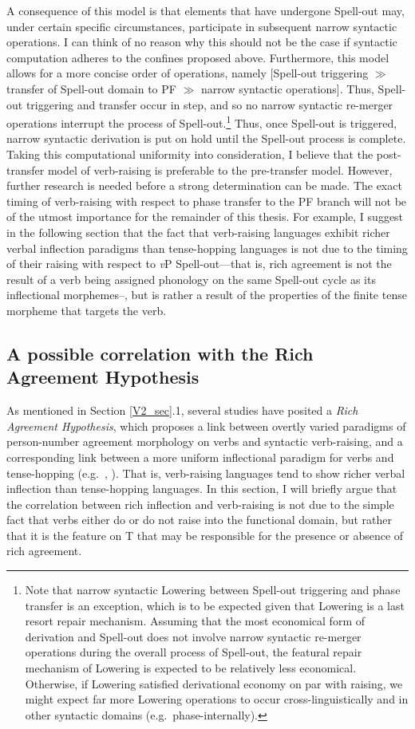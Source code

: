 A consequence of this model is that elements that have undergone Spell-out may, under certain specific circumstances, participate in subsequent narrow syntactic operations. I can think of no reason why this should not be the case if syntactic computation adheres to the confines proposed above. Furthermore, this model allows for a more concise order of operations, namely [Spell-out triggering $\gg$ transfer of Spell-out domain to PF $\gg$ narrow syntactic operations]. Thus, Spell-out triggering and transfer occur in step, and so no narrow syntactic re-merger operations interrupt the process of Spell-out.\footnote{\label{Low_order_fn}Note that narrow syntactic Lowering between Spell-out triggering and phase transfer is an exception, which is to be expected given that Lowering is a last resort repair mechanism. Assuming that the most economical form of derivation and Spell-out does not involve narrow syntactic re-merger operations during the overall process of Spell-out, the featural repair mechanism of Lowering is expected to be relatively less economical. Otherwise, if Lowering satisfied derivational economy on par with raising, we might expect far more Lowering operations to occur cross-linguistically and in other syntactic domains (e.g.\ phase-internally).} Thus, once Spell-out is triggered, narrow syntactic derivation is put on hold until the Spell-out process is complete. Taking this computational uniformity into consideration, I believe that the post-transfer model of verb-raising is preferable to the pre-transfer model. However, further research is needed before a strong determination can be made. The exact timing of verb-raising with respect to phase transfer to the PF branch will not be of the utmost importance for the remainder of this thesis. For example, I suggest in the following section that the fact that verb-raising languages exhibit richer verbal inflection paradigms than tense-hopping languages is not due to the timing of their raising with respect to {\it v}P Spell-out---that is, rich agreement is not the result of a verb being assigned phonology on the same Spell-out cycle as its inflectional morphemes--, but is rather a result of the properties of the finite tense morpheme that targets the verb.

\subsection{A possible correlation with the Rich Agreement Hypothesis}\label{rich_agr_sec}
As mentioned in Section \ref{V2_sec}.1, several studies have posited a {\it Rich Agreement Hypothesis}, which proposes a link between overtly varied paradigms of person-number agreement morphology on verbs and syntactic verb-raising, and a corresponding link between a more uniform inflectional paradigm for verbs and tense-hopping (e.g.\ , ). That is, verb-raising languages tend to show richer verbal inflection than tense-hopping languages. In this section, I will briefly argue that the correlation between rich inflection and verb-raising is not due to the simple fact that verbs either do or do not raise into the functional domain, but rather that it is the feature on T that may be responsible for the presence or absence of rich agreement.

